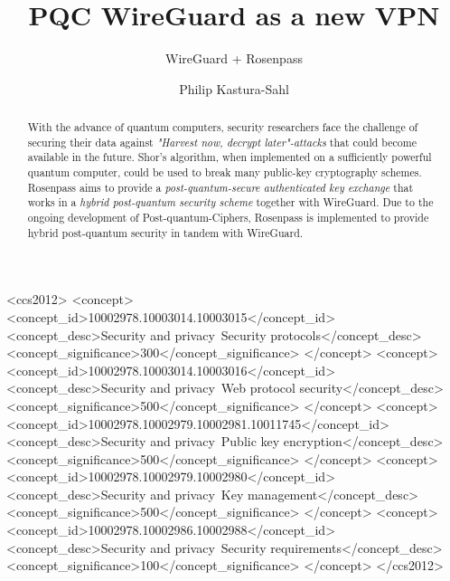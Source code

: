 \documentclass[sigconf]{acmart}
\begin{document}
\title{PQC WireGuard as a new VPN}
\subtitle{WireGuard + Rosenpass}

\author{Philip Kastura-Sahl}

\renewcommand{\shortauthors}{Philip Kastura-Sahl}

\begin{abstract}
  With the advance of quantum computers, security researchers face the challenge of securing their data against \textit{"Harvest now, decrypt later"-attacks} that could become available in the future. Shor's algorithm\cite{Shor_1997}, when implemented on a sufficiently powerful quantum computer, could be used to break many public-key cryptography schemes. Rosenpass aims to provide a \textit{post-quantum-secure authenticated key exchange} that works in a \textit{hybrid post-quantum security scheme} together with WireGuard. Due to the ongoing development of Post-quantum-Ciphers, Rosenpass is implemented to provide hybrid post-quantum security in tandem with WireGuard\cite{Rosenpass-about}.
\end{abstract}

\begin{CCSXML}
  <ccs2012>
  <concept>
  <concept_id>10002978.10003014.10003015</concept_id>
  <concept_desc>Security and privacy~Security protocols</concept_desc>
  <concept_significance>300</concept_significance>
  </concept>
  <concept>
  <concept_id>10002978.10003014.10003016</concept_id>
  <concept_desc>Security and privacy~Web protocol security</concept_desc>
  <concept_significance>500</concept_significance>
  </concept>
  <concept>
  <concept_id>10002978.10002979.10002981.10011745</concept_id>
  <concept_desc>Security and privacy~Public key encryption</concept_desc>
  <concept_significance>500</concept_significance>
  </concept>
  <concept>
  <concept_id>10002978.10002979.10002980</concept_id>
  <concept_desc>Security and privacy~Key management</concept_desc>
  <concept_significance>500</concept_significance>
  </concept>
  <concept>
  <concept_id>10002978.10002986.10002988</concept_id>
  <concept_desc>Security and privacy~Security requirements</concept_desc>
  <concept_significance>100</concept_significance>
  </concept>
  </ccs2012>
\end{CCSXML}

\end{document}
